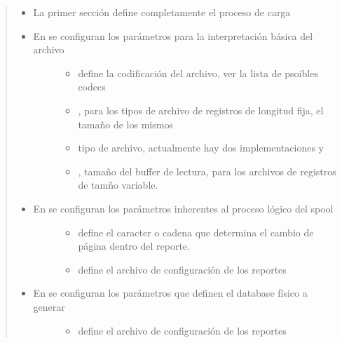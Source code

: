 \documentclass[a4paper,12pt,spanish]{sphinxmanual}
\begin{document}
\begin{quote}
\begin{itemize}
\item {} 
La primer sección  define completamente el proceso de carga

\item {} \begin{description}
\item[{En  se configuran los parámetros para la interpretación básica del archivo}] \leavevmode\begin{itemize}
\item {} 
 define la codificación del archivo, ver  la lista de psoibles codecs

\item {} 
, para los tipos de archivo de registros de longitud fija, el tamaño de los mismos

\item {} 
 tipo de archivo, actualmente hay dos implementaciones  y 

\item {} 
, tamaño del buffer de lectura, para los archivos de registros de tamño variable.

\end{itemize}

\end{description}

\item {} \begin{description}
\item[{En  se configuran los parámetros inherentes al proceso lógico del spool}] \leavevmode\begin{itemize}
\item {} 
 define el caracter o cadena que determina el cambio de página dentro del reporte.

\item {} 
 define el archivo de configuración de los reportes

\end{itemize}

\end{description}

\item {} \begin{description}
\item[{En  se configuran los parámetros que definen el database físico a generar}] \leavevmode\begin{itemize}
\item {} 
 define el archivo de configuración de los reportes


\end{itemize}
\end{description}
\end{itemize}
\end{quote}
\end{document}
